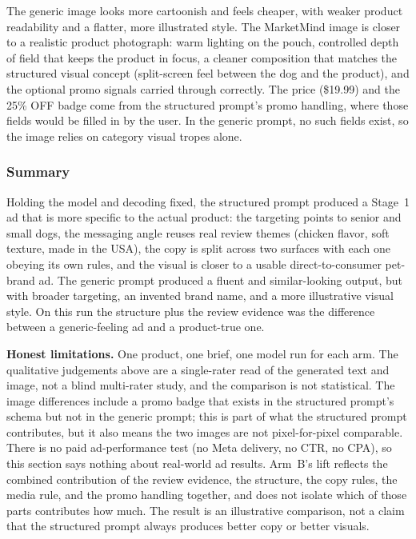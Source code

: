 \documentclass[12pt,a4paper]{report}
\begin{document}
The generic image looks more cartoonish and feels cheaper, with weaker product readability and a flatter, more illustrated style. The MarketMind image is closer to a realistic product photograph: warm lighting on the pouch, controlled depth of field that keeps the product in focus, a cleaner composition that matches the structured visual concept (split-screen feel between the dog and the product), and the optional promo signals carried through correctly. The price (\$19.99) and the 25\% OFF badge come from the structured prompt's promo handling, where those fields would be filled in by the user. In the generic prompt, no such fields exist, so the image relies on category visual tropes alone.

\subsubsection*{Summary}

Holding the model and decoding fixed, the structured prompt produced a Stage~1 ad that is more specific to the actual product: the targeting points to senior and small dogs, the messaging angle reuses real review themes (chicken flavor, soft texture, made in the USA), the copy is split across two surfaces with each one obeying its own rules, and the visual is closer to a usable direct-to-consumer pet-brand ad. The generic prompt produced a fluent and similar-looking output, but with broader targeting, an invented brand name, and a more illustrative visual style. On this run the structure plus the review evidence was the difference between a generic-feeling ad and a product-true one.

\textbf{Honest limitations.} One product, one brief, one model run for each arm. The qualitative judgements above are a single-rater read of the generated text and image, not a blind multi-rater study, and the comparison is not statistical. The image differences include a promo badge that exists in the structured prompt's schema but not in the generic prompt; this is part of what the structured prompt contributes, but it also means the two images are not pixel-for-pixel comparable. There is no paid ad-performance test (no Meta delivery, no CTR, no CPA), so this section says nothing about real-world ad results. Arm~B's lift reflects the combined contribution of the review evidence, the structure, the copy rules, the media rule, and the promo handling together, and does not isolate which of those parts contributes how much. The result is an illustrative comparison, not a claim that the structured prompt always produces better copy or better visuals.
\end{document}
